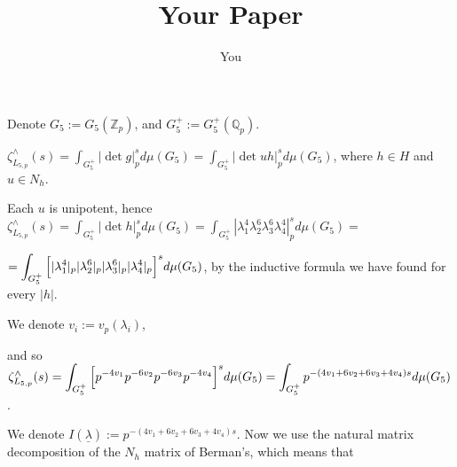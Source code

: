 \documentclass{article}
\title{Your Paper}
\author{You}
\begin{document}
\maketitle
Denote $G_{5}:=G_{5}(\mathbb{Z}_{p})$, and $G_{5}^{+}:=G_{5}^{+}(\mathbb{Q}_{p})$.

$\zeta_{L_{5,p}}^{\wedge}(s)=\displaystyle\int_{{G_{5}^{+}}}{|\det{g}|_{p}^{s}}d\mu(G_{5})=\displaystyle\int_{{G_{5}^{+}}}{|\det{uh}|_{p}^{s}}d\mu(G_{5})$, where $h\in{H}$ and $u\in{N_{h}}$. 

Each $u$ is unipotent, hence $\zeta_{L_{5,p}}^{\wedge}(s)=\displaystyle\int_{{G_{5}^{+}}}{|\det{h}|_{p}^{s}}d\mu(G_{5})=\displaystyle\int_{{G_{5}^{+}}}{|\lambda_{1}^{4}\lambda_{2}^{6}\lambda_{3}^{6}\lambda_{4}^{4}|_{p}^{s}}d\mu(G_{5})=$

$=\displaystyle\int_{{G_{5}^{+}}}{\Bigl[|\lambda_{1}^{4}|_{p}|\lambda_{2}^{6}|_{p}|\lambda_{3}^{6}|_{p}|\lambda_{4}^{4}|_{p}\Bigr]^{s}}d\mu(G_{5})$, by the inductive formula we have found for every $|h|$. 

We denote $v_{i}:=v_{p}(\lambda_{i})$, 

and so $\zeta_{L_{5,p}}^{\wedge}(s)=\displaystyle\int_{{G_{5}^{+}}}{\Bigl[p^{-4v_{1}}p^{-6v_{2}}p^{-6v_{3}}p^{-4v_{4}}\Bigr]^{s}}d\mu(G_{5})=\displaystyle\int_{{G_{5}^{+}}}{p^{-(4v_{1}+6v_{2}+6v_{3}+4v_{4})s}}d\mu(G_{5})$. 

We denote $I(\underline{\lambda}):=p^{-(4v_{1}+6v_{2}+6v_{3}+4v_{4})s}$.
Now we use the natural matrix decomposition of the $N_{h}$ matrix of Berman's, which means that
\end{document}
